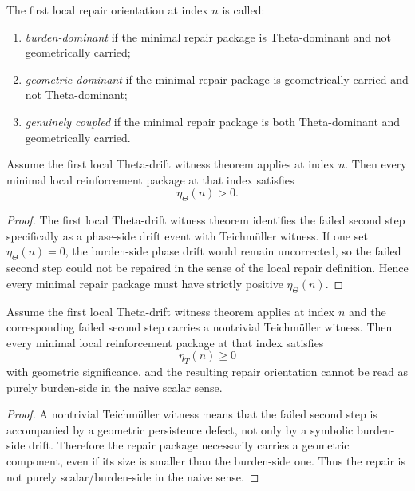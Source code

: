 \begin{definition}
\label{def:locally-coupled-repair-orientation}
The first local repair orientation at index \(n\) is called:
\begin{enumerate}
 \item \emph{burden-dominant} if the minimal repair package is Theta-dominant and not geometrically carried;
 \item \emph{geometric-dominant} if the minimal repair package is geometrically carried and not Theta-dominant;
 \item \emph{genuinely coupled} if the minimal repair package is both Theta-dominant and geometrically carried.
\end{enumerate}
\end{definition}

\begin{proposition}
\label{prop:theta-drift-witnesses-force-nonzero-burden-side-repair}
Assume the first local Theta-drift witness theorem applies at index \(n\).
Then every minimal local reinforcement package at that index satisfies
\[
\eta_{\Theta}(n) > 0.
\]
\end{proposition}

\begin{proof}
The first local Theta-drift witness theorem identifies the failed second step specifically as a phase-side drift event with Teichm\"uller witness.
If one set \(\eta_{\Theta}(n)=0\), the burden-side phase drift would remain uncorrected, so the failed second step could not be repaired in the sense of the local repair definition.
Hence every minimal repair package must have strictly positive \(\eta_{\Theta}(n)\).
\end{proof}

\begin{proposition}
\label{prop:teichmueller-witnesses-make-the-repair-geometrically-visible}
Assume the first local Theta-drift witness theorem applies at index \(n\) and the corresponding failed second step carries a nontrivial Teichm\"uller witness.
Then every minimal local reinforcement package at that index satisfies
\[
\eta_{T}(n)\ge 0
\]
with geometric significance, and the resulting repair orientation cannot be read as purely burden-side in the naive scalar sense.
\end{proposition}

\begin{proof}
A nontrivial Teichm\"uller witness means that the failed second step is accompanied by a geometric persistence defect, not only by a symbolic burden-side drift.
Therefore the repair package necessarily carries a geometric component, even if its size is smaller than the burden-side one.
Thus the repair is not purely scalar/burden-side in the naive sense.
\end{proof}

